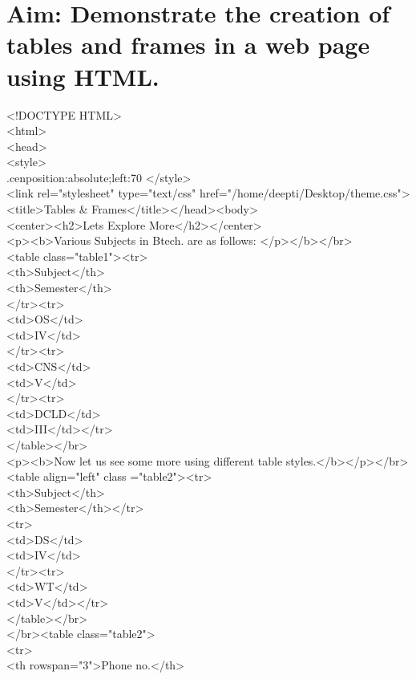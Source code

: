 \section*{\fontsize{16}{14}\selectfont Aim: Demonstrate the creation of tables and frames in a web page using HTML.}
<!DOCTYPE HTML>\\
<html>\\
<head>\\
<style>\\
.cen{position:absolute;left:70%
</style>\\
<link rel="stylesheet" type="text/css" href="/home/deepti/Desktop/theme.css">\\
<title>Tables \& Frames</title></head><body>\\
<center><h2>Lets Explore More</h2></center>\\
<p><b>Various Subjects in Btech. are as follows: </p></b></br>\\
<table class="table1"><tr>\\
<th>Subject</th>\\
<th>Semester</th>\\
</tr><tr>\\
<td>OS</td>\\
<td>IV</td>\\
</tr><tr>\\
<td>CNS</td>\\
<td>V</td>\\
</tr><tr>\\
<td>DCLD</td>\\
<td>III</td></tr>\\
</table></br>\\
<p><b>Now let us see some more using different table styles.</b></p></br>\\
<table align="left" class ="table2"><tr>\\
<th>Subject</th>\\
<th>Semester</th></tr>\\
<tr>\\
<td>DS</td>\\
<td>IV</td>\\
</tr><tr>\\
<td>WT</td>\\
<td>V</td></tr>\\
</table></br>\\
</br><table class="table2">\\
<tr>\\
<th rowspan="3">Phone no.</th>\\
}
